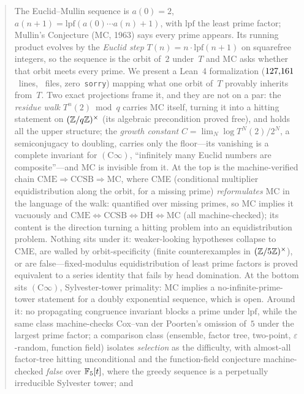 \begin{abstract}
\footnotesize
The Euclid--Mullin sequence is $a(0)=2$,
$a(n{+}1) = \text{lpf}(a(0)\cdots a(n)+1)$, with $\text{lpf}$ the least prime
factor; Mullin's Conjecture (MC, 1963) says every prime appears.  Its
running product evolves by the \emph{Euclid step}
$T(n) = n\cdot\text{lpf}(n{+}1)$ on squarefree integers, so the sequence is
the orbit of~$2$ under~$T$ and MC asks whether that orbit meets every
prime.  We present a Lean~4 formalization ($\EMLineCount$~lines,
\EMFileCount~files, zero~\texttt{sorry}) mapping what one orbit of~$T$
provably inherits from~$T$.
Two exact projections frame it, and they are not on a par: the
\emph{residue walk} $T^n(2) \bmod q$ carries MC itself, turning it into a
hitting statement on $(\ZZ/q\ZZ)^\times$ (its algebraic precondition proved
free), and holds all the upper structure; the \emph{growth constant}
$C = \lim_N \log T^N(2)/2^N$, a semiconjugacy to doubling, carries only the
floor---its vanishing is a complete invariant for $(\mathrm{C}\infty)$,
``infinitely many Euclid numbers are composite''---and MC is invisible
from it.
At the top is the machine-verified chain
$\mathrm{CME} \Rightarrow \mathrm{CCSB} \Rightarrow \mathrm{MC}$, where CME
(conditional multiplier equidistribution along the orbit, for a missing
prime) \emph{reformulates} MC in the language of the walk: quantified over
missing primes, so MC implies it vacuously and $\mathrm{CME}
\Leftrightarrow \mathrm{CCSB} \Leftrightarrow \mathrm{DH} \Leftrightarrow
\mathrm{MC}$ (all machine-checked); its content is the direction turning a
hitting problem into an equidistribution problem.
Nothing sits under it: weaker-looking hypotheses collapse to CME, are
walled by orbit-specificity (finite counterexamples in
$(\ZZ/5\ZZ)^\times$), or are false---fixed-modulus equidistribution of
least prime factors is proved equivalent to a series identity that fails
by head domination.  At the bottom sits $(\mathrm{C}\infty)$,
Sylvester-tower primality: MC implies a no-infinite-prime-tower statement
for a doubly exponential sequence, which is open.  Around it: no propagating
congruence invariant blocks a prime under $\text{lpf}$, while the same class
machine-checks Cox--van der Poorten's omission of~$5$ under the largest
prime factor; a comparison class (ensemble, factor tree, two-point,
$\varepsilon$-random, function field) isolates \emph{selection} as the
difficulty, with almost-all factor-tree hitting unconditional and the
function-field conjecture machine-checked \emph{false} over $\FF_5[t]$,
where the greedy sequence is a perpetually irreducible Sylvester tower; and

\end{abstract}

